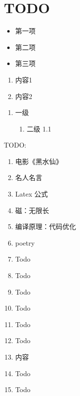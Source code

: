 \section*{TODO}
\begin{itemize}
  \item 第一项
  \item 第二项
  \item 第三项
\end{itemize}


\begin{enumerate}[label=(\alph*)]
  \item 内容1
  \item 内容2
\end{enumerate}

\begin{enumerate}[label=\arabic*., ref=\arabic*]
  \item 一级
  \begin{enumerate}[label=\arabic*., ref=\theenumi.\arabic*]
    \item 二级 1.1
  \end{enumerate}
\end{enumerate}

TODO:
\begin{enumerate}
  \renewcommand{\labelenumi}{(\arabic*)}   %
  \item 电影《黑水仙》
  \item 名人名言
  \item Latex 公式
  \item 磁：无限长
  \item 编译原理：代码优化
  \renewcommand{\labelenumi}{\roman*)}     %
  \item poetry
  \item Todo
  \item Todo
  \item Todo
  \renewcommand{\labelenumi}{\Alph*)}      %
  \item Todo
  \item Todo
  \item Todo
  \renewcommand{\labelenumi}{\alph*)}      %
  \item 内容
  \item Todo
  \item Todo
\end{enumerate}
